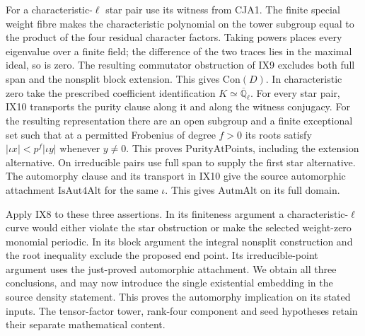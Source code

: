 For a characteristic-$\ell$ star pair use its witness from CJA1. The
finite special weight fibre makes the characteristic polynomial on
the tower subgroup equal to the product of the four residual character
factors. Taking powers places every eigenvalue over a finite field;
the difference of the two traces lies in the maximal ideal, so is zero.
The resulting commutator obstruction of IX9 excludes both full
span and the nonsplit block extension. This gives $\mathrm{Con}(D)$.
In characteristic zero take the prescribed coefficient identification
$K\simeq\overline{\mathbb Q}_\ell$. For every star pair, IX10 transports
the purity clause along it and along the witness conjugacy. For the
resulting representation there are an open subgroup and a finite
exceptional set such that at a permitted Frobenius of degree $f>0$
its roots satisfy $|\iota x|<p^f|\iota y|$ whenever $y\ne0$.
This proves $\mathrm{PurityAtPoints}$, including the extension
alternative. On irreducible pairs use full span to supply the first
star alternative. The automorphy clause and its transport in IX10 give
the source automorphic attachment $\mathrm{IsAut4Alt}$ for the same
$\iota$. This gives $\mathrm{AutmAlt}$ on its full domain.

Apply IX8 to these three assertions. In its finiteness argument a
characteristic-$\ell$ curve would either violate the star obstruction or
make the selected weight-zero monomial periodic. In its block argument
the integral nonsplit construction and the root inequality exclude the
proposed end point. Its irreducible-point argument uses the just-proved
automorphic attachment. We obtain all three conclusions, and may now
introduce the single existential embedding in the source density
statement. This proves the automorphy implication on its stated inputs.
The tensor-factor tower, rank-four component and seed hypotheses retain
their separate mathematical content.
